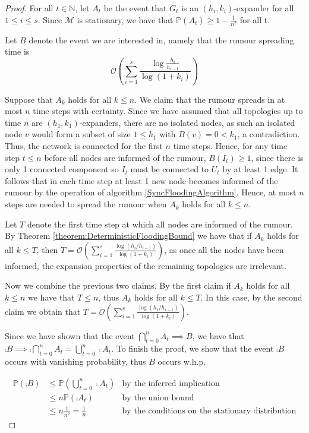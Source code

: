 \begin{proof}
	For all $t \in \mathbb{N}$, let $A_t$ be the event that $G_t$ is an $(h_i, k_i)$-expander for all $1 \leq i \leq s$. Since $\mathcal{M}$ is stationary, we have that $\mathbb{P}(A_t) \geq 1 - \frac{1}{n^2}$ for all t. 

	Let $B$ denote the event we are interested in, namely that the rumour spreading time is 	
	$$
		\mathcal{O}\left(\sum_{i=1}^s \frac{\log \frac{h_i}{h_{i-1}}}{\log(1+k_i)}\right)
	$$

	Suppose that $A_k$ holds for all $k \leq n$. We claim that the rumour spreads in at most $n$ time steps with certainty. Since we have assumed that all topologies up to time $n$ are $(h_1, k_1)$-expanders, there are no isolated nodes, as such an isolated node $v$ would form a subset of size $1 \leq h_1$ with $B({v}) = 0 < k_1$, a contradiction. Thus, the network is connected for the first $n$ time steps. Hence, for any time step $t \leq n$ before all nodes are informed of the rumour, $B(I_t) \geq 1$, since there is only 1 connected component so $I_t$ must be connected  to $U_t$ by at least 1 edge. It follows that in each time step at least 1 new node becomes informed of the rumour by the operation of algorithm \ref{SyncFloodingAlgorithm}. Hence, at most $n$ steps are needed to spread the rumour when $A_k$ holds for all $k \leq n$. 

	Let $T$ denote the first time step at which all nodes are informed of the rumour. By Theorem \ref{theorem:DeterministicFloodingBound} we have that if $A_k$ holds for all $k \leq T$, then $T=\mathcal{O}\left(\sum_{i=1}^s \frac{\log (h_i/h_{i-1})}{\log(1+k_i)}\right)$, as once all the nodes have been informed, the expansion properties of the remaining topologies are irrelevant.

	Now we combine the previous two claims. By the first claim if $A_k$ holds for all $k \leq n$ we have that $T \leq n$, thus $A_k$ holds for all $k \leq T$. In this case, by the second claim we obtain that  $T=\mathcal{O}\left(\sum_{i=1}^s \frac{\log (h_i/h_{i-1})}{\log(1+k_i)}\right)$.

	Since we have shown that the event $\bigcap_{t=0}^n A_t \implies B$, we have that $\comp{B} \implies \comp{ \bigcap_{t=0}^n A_t} = \bigcup_{t=0}^n \comp{A_t}$. To finish the proof, we show that the event $\comp{B}$ occurs with vanishing probability, thus $B$ occurs w.h.p.

	\begin{align*}
		\mathbb{P}(\comp{B}) &\leq \mathbb{P}(\bigcup_{t=0}^n \comp{A_t}) & \text{by the inferred implication} \\ 
		& \leq n \mathbb{P}(\comp{A_t}) & \text{by the union bound}\\ 
		& \leq n \frac{1}{n^2} = \frac{1}{n} & \text{by the conditions on the stationary distribution}
	\end{align*}


\end{proof}

